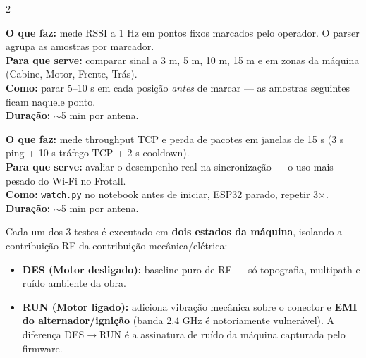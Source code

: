 \documentclass[a4paper,10pt]{article}
\begin{document}
\vspace{3pt}

\begin{multicols}{2}

\begin{tcolorbox}[cxt, title={Teste 2 --- CLOCK (Estático por posição)}]
\small
\textbf{O que faz:} mede RSSI a 1 Hz em pontos fixos marcados pelo operador.
O parser agrupa as amostras por marcador.\\[2pt]
\textbf{Para que serve:} comparar sinal a 3 m, 5 m, 10 m, 15 m e em zonas da
máquina (Cabine, Motor, Frente, Trás).\\[2pt]
\textbf{Como:} parar 5--10 s em cada posição \emph{antes} de marcar --- as
amostras seguintes ficam naquele ponto.\\[2pt]
\textbf{Duração:} $\sim$5 min por antena.
\end{tcolorbox}

\columnbreak

\begin{tcolorbox}[cxam, title={Teste 3 --- BURN (Throughput + PLR)}]
\small
\textbf{O que faz:} mede throughput TCP e perda de pacotes em janelas de 15 s
(3 s ping + 10 s tráfego TCP + 2 s cooldown).\\[2pt]
\textbf{Para que serve:} avaliar o desempenho real na sincronização --- o uso
mais pesado do Wi-Fi no Frotall.\\[2pt]
\textbf{Como:} \texttt{watch.py} no notebook antes de iniciar, ESP32 parado,
repetir 3$\times$.\\[2pt]
\textbf{Duração:} $\sim$5 min por antena.
\end{tcolorbox}

\end{multicols}

\vspace{3pt}

\begin{tcolorbox}[cxr, title={Matriz de Estresse Ambiental --- DES $\times$ RUN}]
\small
Cada um dos 3 testes é executado em \textbf{dois estados da máquina}, isolando
a contribuição RF da contribuição mecânica/elétrica:
\begin{itemize}[leftmargin=*,itemsep=1pt,topsep=2pt]
  \item[\textbullet] \textbf{DES (Motor desligado):} baseline puro de RF --- só
        topografia, multipath e ruído ambiente da obra.
  \item[\textbullet] \textbf{RUN (Motor ligado):} adiciona vibração mecânica
        sobre o conector e \textbf{EMI do alternador/ignição} (banda 2.4 GHz é
        notoriamente vulnerável). A diferença DES$\to$RUN é a assinatura de
        ruído da máquina capturada pelo firmware.
\end{itemize}
\end{tcolorbox}
\end{document}
